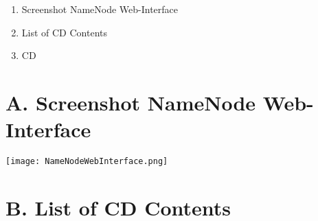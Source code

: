 
\addchap{\langanhang}

{\Large
\begin{enumerate}[label=\Alph*.]
	\item Screenshot NameNode Web-Interface
	\item List of CD Contents
	\item CD 
\end{enumerate}
}
\pagebreak
\section*{A. Screenshot NameNode Web-Interface}
\texttt{[image: NameNodeWebInterface.png]}
\pagebreak
\section*{B. List of CD Contents}

